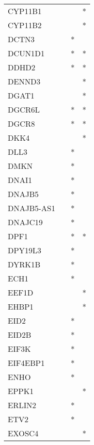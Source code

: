 \begin{longtable}{lccc}
CYP11B1      &           &     &       * \\
CYP11B2      &           &     &       * \\
DCTN3        &           &   * &         \\
DCUN1D1      &           &   * &       * \\
DDHD2        &           &   * &       * \\
DENND3       &           &     &       * \\
DGAT1        &           &     &       * \\
DGCR6L       &           &   * &       * \\
DGCR8        &           &   * &       * \\
DKK4         &           &     &       * \\
DLL3         &           &   * &         \\
DMKN         &           &   * &         \\
DNAI1        &           &   * &         \\
DNAJB5       &           &   * &         \\
DNAJB5-AS1   &           &   * &         \\
DNAJC19      &           &   * &         \\
DPF1         &           &   * &       * \\
DPY19L3      &           &   * &         \\
DYRK1B       &           &   * &         \\
ECH1         &           &   * &         \\
EEF1D        &           &     &       * \\
EHBP1        &           &     &       * \\
EID2         &           &   * &         \\
EID2B        &           &   * &         \\
EIF3K        &           &   * &         \\
EIF4EBP1     &           &   * &         \\
ENHO         &           &   * &         \\
EPPK1        &           &     &       * \\
ERLIN2       &           &   * &         \\
ETV2         &           &   * &         \\
EXOSC4       &           &     &       * \\

\end{longtable}
